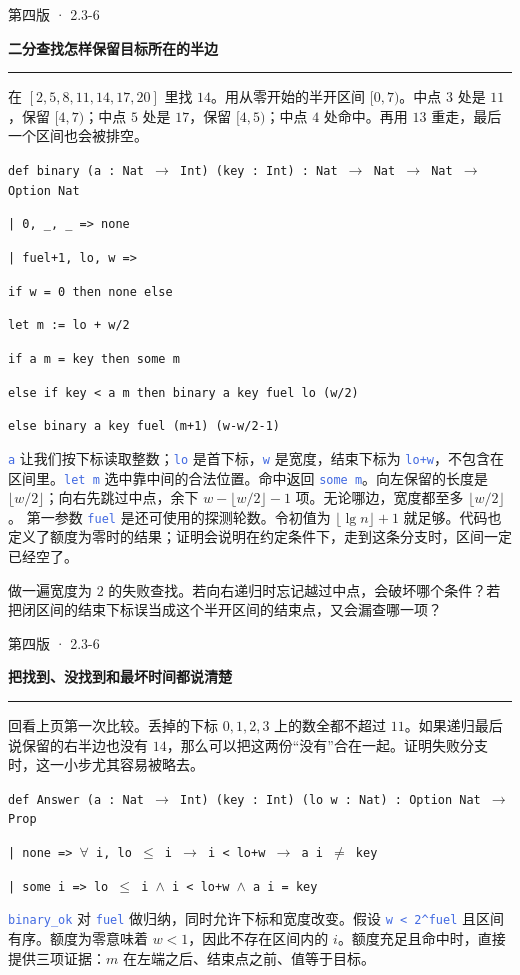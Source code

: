 \documentclass[UTF8,11pt,a4paper,fontset=fandol]{ctexart}
\newcommand{\HandoutLesson}[2]{%
  \par{\small\heiti\color{BrickRed}#1}\par\vspace{3pt}
  {\fontsize{21}{27}\selectfont\heiti\bfseries #2}\par
  \textcolor{BrickRed}{\rule{\linewidth}{.7pt}}\par}
\newcommand{\HandoutBox}[1]{%
  \par\noindent\begingroup\setlength{\fboxsep}{8pt}%
  \colorbox{BrickRed!9}{\parbox{\dimexpr\linewidth-16pt\relax}{#1}}\endgroup\par}
\newcommand{\src}[1]{\textcolor{RoyalBlue}{\texttt{#1}}}
\newenvironment{leanblock}{\par\smallskip\noindent\begin{lrbox}{\leanbox}\begin{minipage}{\dimexpr\linewidth-12pt\relax}\raggedright\small\setlength{\parskip}{0pt}}{\end{minipage}\end{lrbox}\colorbox{RoyalBlue!6}{\usebox{\leanbox}}\par\smallskip}
\newcommand{\lineofcode}[2]{\noindent\hspace*{#1em}\strut\texttt{#2}\par}
\begin{document}
\clearpage{}\label{p35}\HandoutLesson{第四版 · 2.3-6}{二分查找怎样保留目标所在的半边}
在 $[2,5,8,11,14,17,20]$ 里找 $14$。用从零开始的半开区间 $[0,7)$。中点 $3$ 处是 $11$，保留 $[4,7)$；中点 $5$ 处是 $17$，保留 $[4,5)$；中点 $4$ 处命中。再用 $13$ 重走，最后一个区间也会被排空。
\begin{leanblock}
\lineofcode{0.0}{def binary (a : Nat \ensuremath{\to} Int) (key : Int) : Nat \ensuremath{\to} Nat \ensuremath{\to} Nat \ensuremath{\to} Option Nat}
\lineofcode{0.9}{| 0, \_, \_ => none}
\lineofcode{0.9}{| fuel+1, lo, w =>}
\lineofcode{1.8}{if w = 0 then none else}
\lineofcode{1.8}{let m := lo + w/2}
\lineofcode{1.8}{if a m = key then some m}
\lineofcode{1.8}{else if key < a m then binary a key fuel lo (w/2)}
\lineofcode{1.8}{else binary a key fuel (m+1) (w-w/2-1)}
\end{leanblock}
\src{a} 让我们按下标读取整数；\src{lo} 是首下标，\src{w} 是宽度，结束下标为 \src{lo+w}，不包含在区间里。\src{let m} 选中靠中间的合法位置。命中返回 \src{some m}。向左保留的长度是 $\lfloor w/2\rfloor$；向右先跳过中点，余下 $w-\lfloor w/2\rfloor-1$ 项。无论哪边，宽度都至多 $\lfloor w/2\rfloor$。
第一参数 \src{fuel} 是还可使用的探测轮数。令初值为 $\lfloor\lg n\rfloor+1$ 就足够。代码也定义了额度为零时的结果；证明会说明在约定条件下，走到这条分支时，区间一定已经空了。
\HandoutBox{做一遍宽度为 $2$ 的失败查找。若向右递归时忘记越过中点，会破坏哪个条件？若把闭区间的结束下标误当成这个半开区间的结束点，又会漏查哪一项？}
\par{}
\clearpage{}\label{p36}\HandoutLesson{第四版 · 2.3-6}{把找到、没找到和最坏时间都说清楚}
回看上页第一次比较。丢掉的下标 $0,1,2,3$ 上的数全都不超过 $11$。如果递归最后说保留的右半边也没有 $14$，那么可以把这两份“没有”合在一起。证明失败分支时，这一小步尤其容易被略去。
\begin{leanblock}
\lineofcode{0.0}{def Answer (a : Nat \ensuremath{\to} Int) (key : Int) (lo w : Nat) : Option Nat \ensuremath{\to} Prop}
\lineofcode{0.9}{| none => \ensuremath{\forall} i, lo \ensuremath{\leq} i \ensuremath{\to} i < lo+w \ensuremath{\to} a i \ensuremath{\ne} key}
\lineofcode{0.9}{| some i => lo \ensuremath{\leq} i \ensuremath{\wedge} i < lo+w \ensuremath{\wedge} a i = key}
\end{leanblock}
\src{binary\_ok} 对 \src{fuel} 做归纳，同时允许下标和宽度改变。假设 \src{w < 2\textasciicircum{}fuel} 且区间有序。额度为零意味着 $w<1$，因此不存在区间内的 $i$。额度充足且命中时，直接提供三项证据：$m$ 在左端之后、结束点之前、值等于目标。
\end{document}
